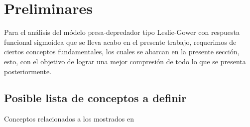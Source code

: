 \chapter{Preliminares}
    Para el análisis del módelo presa-depredador tipo Leslie-Gower con respuesta funcional sigmoidea que se lleva acabo en el presente trabajo, requerimos de ciertos conceptos fundamentales, los cuales se abarcan en la presente sección, esto, con el objetivo de lograr una mejor compresión de todo lo que se presenta posteriormente.
    
    \section*{Posible lista de conceptos a definir}
    Conceptos relacionados a los mostrados en \cite{articulo}
    
